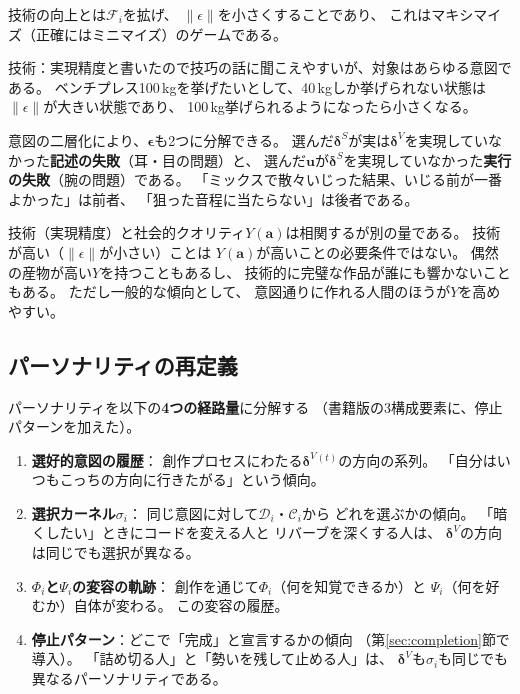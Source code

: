 \documentclass[a4paper, fontsize=10pt]{jlreq}
\newcommand{\va}{\bm{a}}
\newcommand{\vu}{\bm{u}}
\newcommand{\Phii}{\Phi_i}
\newcommand{\Psii}{\Psi_i}
\newcommand{\Ci}{\mathcal{C}_i}
\newcommand{\Fi}{\mathcal{F}_i}
\newcommand{\dV}{\bm{\delta}^{V}}          %
\newcommand{\dS}{\bm{\delta}^{S}}          %
\newcommand{\Di}{\mathcal{D}_i}            %
\begin{document}
技術の向上とは$\Fi$を拡げ、
$\lVert\epsilon\rVert$を小さくすることであり、
これはマキシマイズ（正確にはミニマイズ）のゲームである。

技術：実現精度と書いたので技巧の話に聞こえやすいが、対象はあらゆる意図である。
ベンチプレス100\,kgを挙げたいとして、40\,kgしか挙げられない状態は
$\lVert\epsilon\rVert$が大きい状態であり、
100\,kg挙げられるようになったら小さくなる。

意図の二層化により、$\bm{\epsilon}$も2つに分解できる。
選んだ$\dS$が実は$\dV$を実現していなかった\textbf{記述の失敗}（耳・目の問題）と、
選んだ$\vu$が$\dS$を実現していなかった\textbf{実行の失敗}（腕の問題）である。
「ミックスで散々いじった結果、いじる前が一番よかった」は前者、
「狙った音程に当たらない」は後者である。

\medskip

技術（実現精度）と社会的クオリティ$Y(\va)$は相関するが別の量である。
技術が高い（$\lVert\epsilon\rVert$が小さい）ことは
$Y(\va)$が高いことの必要条件ではない。
偶然の産物が高い$Y$を持つこともあるし、
技術的に完璧な作品が誰にも響かないこともある。
ただし一般的な傾向として、
意図通りに作れる人間のほうが$Y$を高めやすい。

\subsection{パーソナリティの再定義}\label{subsec:personality-redef}

パーソナリティを以下の\textbf{4つの経路量}に分解する
（書籍版の3構成要素に、停止パターンを加えた）。

\begin{enumerate}[leftmargin=2em]
  \item \textbf{選好的意図の履歴}：
    創作プロセスにわたる$\dV{}^{(t)}$の方向の系列。
    「自分はいつもこっちの方向に行きたがる」という傾向。
  \item \textbf{選択カーネル}$\sigma_i$：
    同じ意図に対して$\Di$・$\Ci$から
    どれを選ぶかの傾向。
    「暗くしたい」ときにコードを変える人と
    リバーブを深くする人は、
    $\dV$の方向は同じでも選択が異なる。
  \item \textbf{$\Phii$と$\Psii$の変容の軌跡}：
    創作を通じて$\Phii$（何を知覚できるか）と
    $\Psii$（何を好むか）自体が変わる。
    この変容の履歴。
  \item \textbf{停止パターン}：どこで「完成」と宣言するかの傾向
    （第\ref{sec:completion}節で導入）。
    「詰め切る人」と「勢いを残して止める人」は、
    $\dV$も$\sigma_i$も同じでも異なるパーソナリティである。
\end{enumerate}
\end{document}
